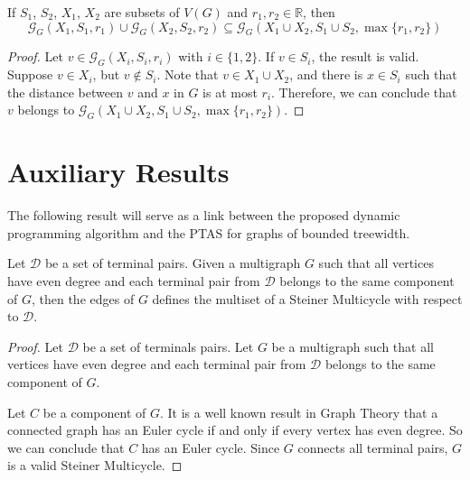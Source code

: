 \begin{corollary} \label{groupCor}
If \(S_1\), \(S_2\), \(X_1\), \(X_2\) are subsets of \(V(G)\) and \(r_1, r_2 \in \mathbb{R}\), then \[\mathcal{G}_G(X_1, S_1, r_1) \cup \mathcal{G}_G(X_2, S_2, r_2) \subseteq \mathcal{G}_G(X_1 \cup X_2, S_1 \cup S_2, \max\{r_1, r_2\})\]
\end{corollary}
\begin{proof}

Let \(v \in \mathcal{G}_G(X_i, S_i, r_i)\) with $i \in \{1,2\}$. If \(v \in S_i\), the result is valid. Suppose \(v \in X_i\), but \(v \not\in S_i\). Note that \(v \in X_1 \cup X_2\), and there is \(x \in S_i\) such that the distance between \(v\) and \(x\) in \(G\) is at most \(r_i\). Therefore, we can conclude that \(v\) belongs to \(\mathcal{G}_G(X_1 \cup X_2, S_1 \cup S_2, \max\{r_1, r_2\})\).

\end{proof}

\section{Auxiliary Results}

The following result will serve as a link between the proposed dynamic programming algorithm and the PTAS for graphs of bounded treewidth.

\begin{lemma}\label{evenEdgesSubgraph}
Let \(\mathcal{D}\) be a set of terminal pairs. Given a multigraph \(G\) such that all vertices have even degree and each terminal pair from \(\mathcal{D}\) belongs to the same component of \(G\), then the edges of \(G\) defines the multiset of a Steiner Multicycle with respect to \(\mathcal{D}\).
\end{lemma}


\begin{proof}

Let \(\mathcal{D}\) be a set of terminals pairs. Let \(G\) be a multigraph such that all vertices have even degree and each terminal pair from \(\mathcal{D}\) belongs to the same component of \(G\).

Let \(C\) be a component of \(G\). It is a well known result in Graph Theory that a connected graph has an Euler cycle if and only if every vertex has even degree. So we can conclude that \(C\) has an Euler cycle. Since \(G\) connects all terminal pairs, \(G\) is a valid Steiner Multicycle.

\end{proof}

